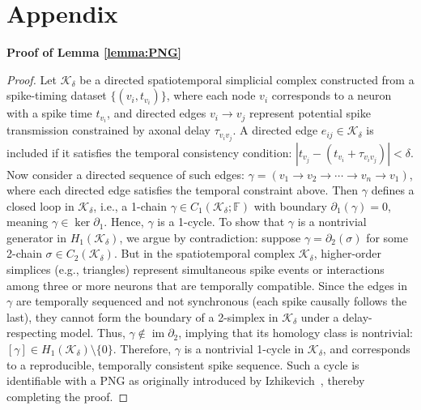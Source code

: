 \documentclass[lettersize,journal]{IEEEtran}
\begin{document}




\appendix
\section{Appendix}

\noindent\textbf{Proof of Lemma \ref{lemma:PNG}}

\begin{proof}
Let \( \mathcal{K}_\delta \) be a directed spatiotemporal simplicial complex constructed from a spike-timing dataset \( \{(v_i, t_{v_i})\} \), where each node \( v_i \) corresponds to a neuron with a spike time \( t_{v_i} \), and directed edges \( v_i \rightarrow v_j \) represent potential spike transmission constrained by axonal delay \( \tau_{v_i v_j} \). A directed edge \( e_{ij} \in \mathcal{K}_\delta \) is included if it satisfies the temporal consistency condition:
$|t_{v_j} - (t_{v_i} + \tau_{v_i v_j})| < \delta$.
Now consider a directed sequence of such edges:
$\gamma = (v_1 \rightarrow v_2 \rightarrow \cdots \rightarrow v_n \rightarrow v_1)$,
where each directed edge satisfies the temporal constraint above. Then \( \gamma \) defines a closed loop in \( \mathcal{K}_\delta \), i.e., a 1-chain \( \gamma \in C_1(\mathcal{K}_\delta; \mathbb{F}) \) with boundary
$\partial_1(\gamma) = 0$,
meaning \( \gamma \in \ker \partial_1 \). Hence, \( \gamma \) is a 1-cycle.
To show that \( \gamma \) is a nontrivial generator in \( H_1(\mathcal{K}_\delta) \), we argue by contradiction: suppose \( \gamma = \partial_2(\sigma) \) for some 2-chain \( \sigma \in C_2(\mathcal{K}_\delta) \). But in the spatiotemporal complex \( \mathcal{K}_\delta \), higher-order simplices (e.g., triangles) represent simultaneous spike events or interactions among three or more neurons that are temporally compatible. Since the edges in \( \gamma \) are temporally sequenced and not synchronous (each spike causally follows the last), they cannot form the boundary of a 2-simplex in \( \mathcal{K}_\delta \) under a delay-respecting model. Thus, \( \gamma \notin \operatorname{im} \partial_2 \), implying that its homology class is nontrivial:
$[\gamma] \in H_1(\mathcal{K}_\delta) \setminus \{0\}$.
Therefore, \( \gamma \) is a nontrivial 1-cycle in \( \mathcal{K}_\delta \), and corresponds to a reproducible, temporally consistent spike sequence. Such a cycle is identifiable with a PNG as originally introduced by Izhikevich~\cite{izhikevich2006polychronization}, thereby completing the proof.
\end{proof}
\end{document}
